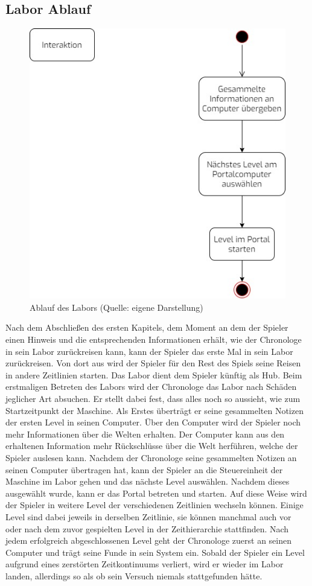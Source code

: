 \subsection{Labor Ablauf}
\begin{figure}[ht]
\centering
\includegraphics[width=0.3\linewidth]{content/pictures/labor_loop.jpg}
\caption{Ablauf des Labors (Quelle: eigene Darstellung)}
\label{fig:labor_loop}
\end{figure}

Nach dem Abschließen des ersten Kapitels, dem Moment an dem der Spieler einen Hinweis und die entsprechenden Informationen erhält, wie der Chronologe in sein Labor zurückreisen kann, kann der Spieler das erste Mal in sein Labor zurückreisen. Von dort aus wird der Spieler für den Rest des Spiels seine Reisen in andere Zeitlinien starten. Das Labor dient dem Spieler künftig als Hub. Beim erstmaligen Betreten des Labors wird der Chronologe das Labor nach Schäden jeglicher Art absuchen. Er stellt dabei fest, dass alles noch so aussieht, wie zum Startzeitpunkt der Maschine. Als Erstes überträgt er seine gesammelten Notizen der ersten Level in seinen Computer. Über den Computer wird der Spieler noch mehr Informationen über die Welten erhalten. Der Computer kann aus den erhaltenen Information mehr Rückschlüsse über die Welt herführen, welche der Spieler auslesen kann. Nachdem der Chronologe seine gesammelten Notizen an seinen Computer übertragen hat, kann der Spieler an die Steuereinheit der Maschine im Labor gehen und das nächste Level auswählen. Nachdem dieses ausgewählt wurde, kann er das Portal betreten und starten. Auf diese Weise wird der Spieler in weitere Level der verschiedenen Zeitlinien wechseln können. Einige Level sind dabei jeweils in derselben Zeitlinie, sie können manchmal auch vor oder nach dem zuvor gespielten Level in der Zeithierarchie stattfinden. Nach jedem erfolgreich abgeschlossenen Level geht der Chronologe zuerst an seinen Computer und trägt seine Funde in sein System ein. Sobald der Spieler ein Level aufgrund eines zerstörten Zeitkontinuums verliert, wird er wieder im Labor landen, allerdings so als ob sein Versuch niemals stattgefunden hätte.

